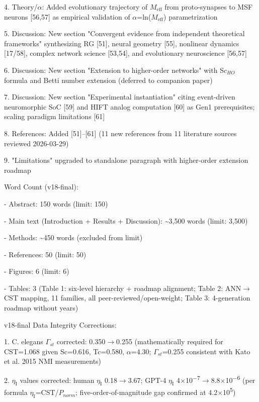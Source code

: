 \documentclass[a4paper,12pt]{article}
\begin{document}
4. Theory/$\alpha$: Added evolutionary trajectory of $M_{\text{eff}}$ from proto-synapses to MSF neurons [56,57] as empirical validation of $\alpha$=ln($M_{\text{eff}}$) parametrization

5. Discussion: New section "Convergent evidence from independent theoretical frameworks" synthesizing RG [51], neural geometry [55], nonlinear dynamics [17/58], complex network science [53,54], and evolutionary neuroscience [56,57]

6. Discussion: New section "Extension to higher-order networks" with S$c_{HO}$ formula and Betti number extension (deferred to companion paper)

7. Discussion: New section "Experimental instantiation" citing event-driven neuromorphic SoC [59] and HIFT analog computation [60] as Gen1 prerequisites; scaling paradigm limitations [61]

8. References: Added [51]--[61] (11 new references from 11 literature sources reviewed 2026-03-29)

9. "Limitations" upgraded to standalone paragraph with higher-order extension roadmap

Word Count (v18-final):

- Abstract: 150 words \checkmark (limit: 150)

- Main text (Introduction + Results + Discussion): \textasciitilde{}3,500 words \checkmark (limit: 3,500)

- Methods: \textasciitilde{}450 words (excluded from limit)

- References: 50 \checkmark (limit: 50)

- Figures: 6 \checkmark (limit: 6)

- Tables: 3 (Table 1: six-level hierarchy + roadmap alignment; Table 2: ANN$\rightarrow$CST mapping, 11 families, all peer-reviewed/open-weight; Table 3: 4-generation roadmap without years)

v18-final Data Integrity Corrections:

1. C. elegans $\Gamma_{st}$ corrected: 0.350$\rightarrow$0.255 (mathematically required for CST=1.068 given Sc=0.616, Tc=0.580, $\alpha$=4.30; $\Gamma_{st}$=0.255 consistent with Kato et al. 2015 NMI measurements)

2. $\eta_{\text{I}}$ values corrected: human $\eta_{\text{I}}$ 0.18$\rightarrow$3.67; GPT-4 $\eta_{\text{I}}$ 4$\times$10\textsuperscript{$-$}\textsuperscript{7}$\rightarrow$8.8$\times$10\textsuperscript{$-$}\textsuperscript{6} (per formula $\eta_{\text{I}}$=CST/$P_{norm}$; five-order-of-magnitude gap confirmed at 4.2$\times$10\textsuperscript{5})
\end{document}
